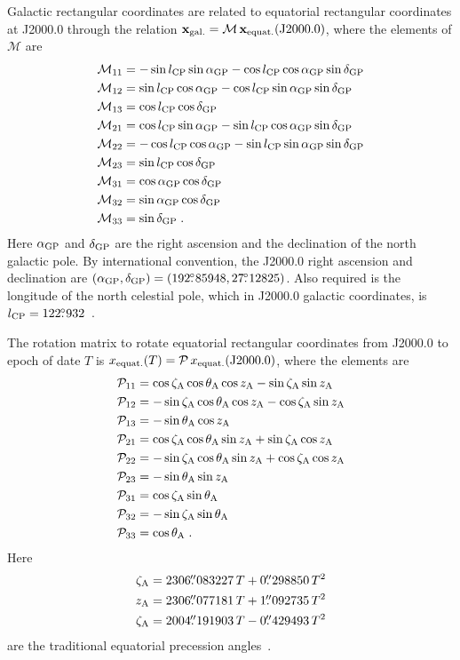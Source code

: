 \documentclass[preprintnumbers,a4paper,twocolumn,floats,nofootinbib,superscriptaddress,aps,prd]{revtex4-1}
\newcommand{\sln}{\sin l_{\rm{CP}}}
\newcommand{\cln}{\cos l_{\rm{CP}}}
\newcommand{\san}{\sin\alpha_{\rm{GP}}}
\newcommand{\can}{\cos\alpha_{\rm{GP}}}
\newcommand{\sdn}{\sin\delta_{\rm{GP}}}
\newcommand{\cdn}{\cos\delta_{\rm{GP}}}
\newcommand{\cze}{\cos\zeta_{\rm{A}}}
\newcommand{\sze}{\sin\zeta_{\rm{A}}}
\newcommand{\cz}{\cos z_{\rm{A}}}
\newcommand{\sz}{\sin z_{\rm{A}}}
\newcommand{\ct}{\cos \theta_{\rm{A}}}
\newcommand{\st}{\sin \theta_{\rm{A}}}
\newcommand\fdg{\hbox{$.\!\!^\circ$}}
\newcommand\farcs{\hbox{$.\!\!^{\prime\prime}$}}
\begin{document}
Galactic rectangular coordinates are related to equatorial rectangular coordinates at J2000.0 through the relation \mbox{$\mathbf{x}_{\rm{gal.}}=\mathcal{M}\,\mathbf{x}_{\rm{equat.}}(\text{J}2000.0)$}, where the elements of $\mathcal{M}$ are
\begin{equation}
\begin{split}
\mathcal{M}_{11}&= -\sln \san-\cln\can\sdn \\
\mathcal{M}_{12}&= \sln \can-\cln \san \sdn \\
\mathcal{M}_{13}&=  \cln \cdn\\
\mathcal{M}_{21}&= \cln \san-\sln \can\sdn   \\
\mathcal{M}_{22}&=  -\cln\can-\sln\san\sdn\\
\mathcal{M}_{23}&=  \sln\cdn\\
\mathcal{M}_{31}&=   \can\cdn   \\
\mathcal{M}_{32}&=  \san\cdn  \\
\mathcal{M}_{33}&= \sdn\;.
\end{split}
\end{equation}
Here $\alpha_{\rm{GP}}$ and $\delta_{\rm{GP}}$ are the right ascension and the declination of the north galactic pole. By international convention, the J2000.0 right ascension and declination are \mbox{$(\alpha_{\rm{GP}},\delta_{\rm{GP}})=(192\fdg85948,27\fdg12825)$}. Also required is the longitude of the north celestial pole, which in J2000.0 galactic coordinates, is $l_{\rm{CP}}=122\fdg932$~\cite{Binney1998}.

The rotation matrix to rotate equatorial rectangular coordinates from J2000.0 to epoch of date $T$ is \mbox{$x_{\rm{equat.}}(T)=\mathcal{P}\,x_{\rm{equat.}}(\text{J}2000.0)$}, where the elements are
\begin{equation}
\begin{split}
\mathcal{P}_{11}&= \cze\ct\cz-\sze\sz \\
\mathcal{P}_{12}&= -\sze\ct\cz-\cze\sz \\
\mathcal{P}_{13}&=-\st\cz \\
\mathcal{P}_{21}&=  \cze\ct\sz+\sze\cz  \\
\mathcal{P}_{22}&= -\sze\ct\sz+\cze\cz\\
\mathcal{P}_{23}&=-\st\sz \\
\mathcal{P}_{31}&=  \cze\st   \\
\mathcal{P}_{32}&= -\sze\st \\
\mathcal{P}_{33}&=\ct\;.
\end{split}
\end{equation}
Here
\begin{align}
\zeta_{\rm{A}}&=2306\farcs083227\,T+0\farcs298850\,T^2\\
z_{\rm{A}}&=2306\farcs077181\,T+1\farcs092735\,T^2\\
\zeta_{\rm{A}}&=2004\farcs191903\,T-0\farcs429493\,T^2
\end{align}
are the traditional equatorial precession angles~\cite{AA2014}. 



\end{document}
